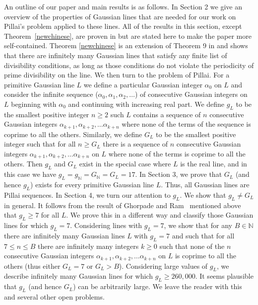 \documentclass[11pt]{article}
\newcommand{\N}{\mathbb{N}}
\begin{document}
An outline of our paper and main results is as follows.  In Section 2 we give an overview of the properties of Gaussian lines that are needed for our work on Pillai's problem applied to these lines. All of the results in this section, except Theorem~\ref{newchinese}, are proven in \cite{magness} but are stated here 
to make the paper more self-contained.  Theorem \ref{newchinese}  is an extension of Theorem 9 in \cite{magness} and shows that there are infinitely many Gaussian lines that satisfy any finite list of divisibility conditions, as long as those conditions do not violate the periodicity of prime divisibility on the line.
We then turn to the problem of Pillai.  For a primitive Gaussian line  $L$ we define a particular Gaussian integer $\alpha_0$ on $L$ and consider the infinite sequence   ($\alpha_0, \alpha_1, \alpha_2, \ldots $)
 of consecutive Gaussian integers on $L$ beginning with $\alpha_0$ and continuing with increasing real part.
We define
$g_L$ to be the smallest positive integer $n\geq 2$ such $L$ contains a sequence of $n$ consecutive Gaussian integers $\alpha_{k+1}, \alpha_{k+2}, \ldots \alpha_{k+n}$  where none of the terms of the sequence is coprime to all the others. Similarly, we define $G_L$
to be the smallest positive integer such that for all
$n\geq G_L$ there is a sequence of $n$ consecutive Gaussian integers $\alpha_{k+1}, \alpha_{k+2}, \ldots \alpha_{k+n}$ on $L$ where none of the terms is coprime to all the others. 
Then $g_L$ and $G_L$ exist in the special case where $L$ is the real line, and in this case we have $g_L=g_\N=G_\N=G_L=17$. In Section 3, we prove that $G_L$ (and hence $g_L$) exists for every primitive Gaussian line $L$. Thus, all Gaussian lines are Pillai sequences.  In Section 4, we turn our attention to $g_L$.  We show that $g_L\neq G_L$ in general. It follows from the result of Ghorpade and Ram~\cite{ghorpade} mentioned above that  $g_L\geq 7$ for all $L$.  We prove this in a different way and classify those Gaussian lines for which $g_L=7$. Considering lines with $g_L=7$, we show 
that for any $B\in\N$ there are infinitely many Gaussian lines $L$ with $g_L=7$ and such that for all $7\leq n\leq B$ there are infinitely many  integers   $k\geq 0$ such that none of the $n$ consecutive Gaussian integers $\alpha_{k+1}, \alpha_{k+2}, \ldots \alpha_{k+n}$ on $L$   is coprime to all the others (thus either $G_L=7$ or $G_L>B$).
Considering large values of $g_L$, we describe infinitely many Gaussian lines for which $g_L\geq 260,000$.  It seems plausible that $g_L$ (and hence $G_L$) can be arbitrarily large.   We leave the reader with this and several other open problems.
 
\end{document}
